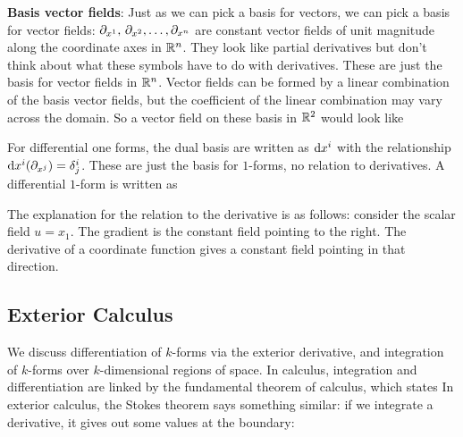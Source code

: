 \textbf{Basis vector fields}: Just as we can pick a basis for vectors, we can pick a basis for vector fields: $\partial_{x^1},\, \partial_{x^2}, \dotsc, \partial_{x^n}$ are constant vector fields of unit magnitude along the coordinate axes in $\mathbb{R}^n$. They look like partial derivatives but don't think about what these symbols have to do with derivatives. These are just the basis for vector fields in $\mathbb{R}^n$. Vector fields can be formed by a linear combination of the basis vector fields, but the coefficient of the linear combination may vary across the domain. So a vector field on these basis in $\mathbb{R}^2$ would look like

For differential one forms, the dual basis are written as $\mathrm{d} x^i$ with the relationship $\mathrm{d} x^i(\partial_{x^j}) = \delta^i_j$. These are just the basis for $1$-forms, no relation to derivatives. A differential $1$-form is written as

The explanation for the relation to the derivative is as follows: consider the scalar field $u = x_1$. The gradient is the constant field pointing to the right. The derivative of a coordinate function gives a constant field pointing in that direction. 

\subsection{Exterior Calculus}
We discuss differentiation of $k$-forms via the exterior derivative, and integration of $k$-forms over $k$-dimensional regions of space. In calculus, integration and differentiation are linked by the fundamental theorem of calculus, which states
In exterior calculus, the Stokes theorem says something similar: if we integrate a derivative, it gives out some values at the boundary:

